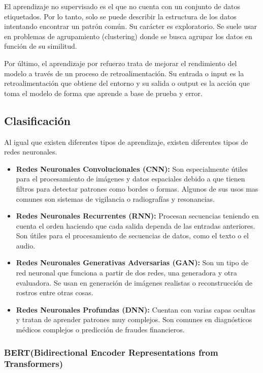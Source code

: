 El aprendizaje no supervisado es el que no cuenta con un conjunto de datos etiquetados. 
Por lo tanto, solo se puede describir la estructura de los datos intentando encontrar un patrón común. Su carácter es exploratorio.
Se suele usar en problemas de agrupamiento (clustering) donde se busca agrupar los datos en función de su similitud.

Por último, el aprendizaje por refuerzo trata de mejorar el rendimiento del modelo a través de un proceso de retroalimentación.
Su entrada o input es la retroalimentación que obtiene del entorno y su salida o output es la acción que toma el modelo de forma que aprende a base de prueba y error. \cite{aprendizajes}

\subsection{Clasificación}

Al igual que existen diferentes tipos de aprendizaje, existen diferentes tipos de redes neuronales.

\begin{itemize}
	\item \textbf{Redes Neuronales Convolucionales (CNN):} Son especialmente útiles para el procesamiento de imágenes y datos espaciales debido a que tienen filtros para detectar patrones como bordes o formas. Algunos de sus usos mas comunes son sistemas de vigilancia o radiografías y resonancias.
	\item \textbf{Redes Neuronales Recurrentes (RNN):} Procesan secuencias teniendo en cuenta el orden haciendo que cada salida dependa de las entradas anteriores. Son útiles para el procesamiento de secuencias de datos, como el texto o el audio.\cite{ibm:rnn}
	\item \textbf{Redes Neuronales Generativas Adversarias (GAN):} Son un tipo de red neuronal que funciona a partir de dos redes, una generadora y otra evaluadora. Se usan en generación de imágenes realistas o reconstrucción de rostros entre otras cosas.
	\item \textbf{Redes Neuronales Profundas (DNN):} Cuentan con varias capas ocultas y tratan de aprender patrones muy complejos. Son comunes en diagnósticos médicos complejos o predicción de fraudes financieros.
\end{itemize}

\subsubsection{BERT(Bidirectional Encoder Representations from Transformers)}

